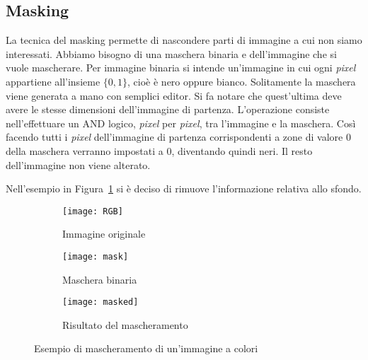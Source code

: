 \subsection {Masking}
La tecnica del masking permette di nascondere parti di immagine a cui non siamo interessati.
Abbiamo bisogno di una maschera binaria e dell'immagine che si vuole mascherare.
Per immagine binaria si intende un'immagine in cui ogni \textit{pixel} appartiene all'insieme $\{0,1\}$, cioè è nero oppure bianco.
Solitamente la maschera viene generata a mano con semplici editor.
Si fa notare che quest'ultima deve avere le stesse dimensioni dell'immagine di partenza.
L'operazione consiste nell'effettuare un AND logico, \textit{pixel} per \textit{pixel},  tra l'immagine e la maschera.
Così facendo tutti i \textit{pixel} dell'immagine di partenza corrispondenti a zone di valore $0$ della maschera verranno impostati a $0$, diventando quindi neri.
Il resto dell'immagine non viene alterato.

Nell'esempio in Figura~\ref{fig:mask_example} si è deciso di rimuove l'informazione relativa allo sfondo.

\begin{figure}[ht] %
  \begin{center}
  \begin{subfigure}{.49\linewidth}
    \centering\texttt{[image: RGB]}
    \caption{Immagine originale}
  \end{subfigure}
  \begin{subfigure}{.49\linewidth}
    \centering\texttt{[image: mask]}
    \caption{Maschera binaria}
  \end{subfigure}
  \begin{subfigure}{.49\linewidth}
    \centering\texttt{[image: masked]}
    \caption{Risultato del mascheramento}
  \end{subfigure}
  \end{center}
    \caption{Esempio di mascheramento di un'immagine a colori}
    \label{fig:mask_example}
\end{figure}


